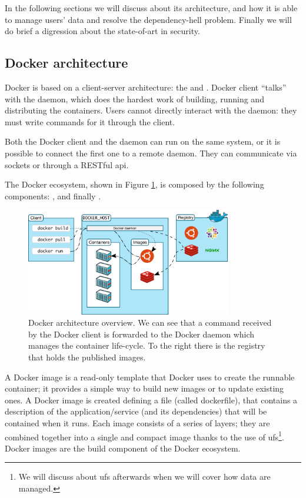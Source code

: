 In the following sections we will discuss about its architecture, and how it is able to manage users'
data and resolve the dependency-hell problem. Finally we will do brief a digression about the state-of-art
in security.

\subsection{Docker architecture}
\label{sec:background-docker-architecture}
Docker is based on a client-server architecture: the  and . Docker
client ``talks'' with the daemon, which does the hardest work of building, running and distributing
the containers. Users cannot directly interact with the daemon: they must write commands for it 
through the client.

Both the Docker client and the daemon can run on the same system, or it is possible to connect the
first one to a remote daemon. They can communicate via sockets or through a RESTful \acs{api}.

The Docker ecosystem, shown in Figure \ref{img:background-docker-architecture-architecture}, is
composed by the following components: ,  and finally
.

\begin{figure}
	\centering{}
	\includegraphics[width=0.8\textwidth]{chapters/background/images/docker-architecture.png}
	\caption[Docker architecture overview]{Docker architecture overview. We can see that a command
		received by the Docker client is forwarded to the Docker daemon which manages the container
		life-cycle. To the right there is the registry that holds the published images.}
	\label{img:background-docker-architecture-architecture}
\end{figure}

A Docker image is a read-only template that Docker uses to create the runnable container; it provides
a simple way to build new images or to update existing ones. A Docker image is created defining a
file (called dockerfile), that contains a description of the application/service (and its dependencies)
that will be contained when it runs. Each image consists of a series of layers; they are combined together
into a single and compact image thanks to the use of \ac{ufs}\footnote{We will discuss about \ac{ufs}
afterwards when we will cover how data are managed.}. Docker images are the build component of the
Docker ecosystem.

